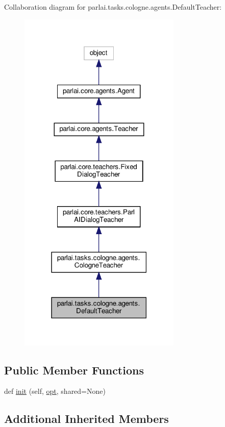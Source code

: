Collaboration diagram for parlai.\+tasks.\+cologne.\+agents.\+Default\+Teacher\+:
\nopagebreak
\begin{figure}[H]
\begin{center}
\leavevmode
\includegraphics[width=219pt]{dd/d0a/classparlai_1_1tasks_1_1cologne_1_1agents_1_1DefaultTeacher__coll__graph}
\end{center}
\end{figure}
\subsection*{Public Member Functions}
\begin{DoxyCompactItemize}
\item 
def \hyperlink{classparlai_1_1tasks_1_1cologne_1_1agents_1_1DefaultTeacher_a513244cd35eaa8c12576fb78bd283689}{init} (self, \hyperlink{classparlai_1_1core_1_1agents_1_1Teacher_a3ce6243860ce978a897922863ed32fa4}{opt}, shared=None)
\end{DoxyCompactItemize}
\subsection*{Additional Inherited Members}



